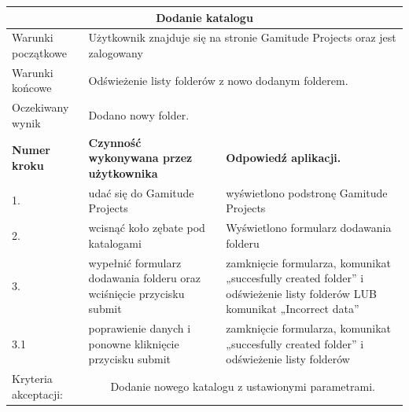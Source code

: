 \documentclass[a4paper,11pt]{report}
\begin{document}
\begin{table}[H]
	\centering
	\begin{tabular}{|p{2cm}|p{6cm}|p{6cm}|}
	\hline
	\multicolumn{3}{|c|}{\textbf{Dodanie katalogu}}\\
	\hline
	Warunki początkowe & \multicolumn{2}{|p{12cm}|}{Użytkownik znajduje się na stronie Gamitude Projects oraz jest zalogowany}\\
	\hline
	Warunki końcowe & \multicolumn{2}{|p{12cm}|}{Odświeżenie listy folderów z nowo dodanym folderem.}\\
	\hline
	Oczekiwany wynik & \multicolumn{2}{|p{12cm}|}{Dodano nowy folder.}\\
	\hline
	\textbf{Numer kroku} & \textbf{Czynność wykonywana przez użytkownika} & \textbf{Odpowiedź aplikacji.} \\
	\hline
	1. & udać się do Gamitude Projects & wyświetlono podstronę Gamitude Projects \\
	\hline
	2. & wcisnąć koło zębate pod katalogami & Wyświetlono formularz dodawania folderu \\
	\hline
	3. & wypełnić formularz dodawania folderu oraz wciśnięcie przycisku submit & zamknięcie formularza, komunikat „succesfully created folder” i odświeżenie listy folderów LUB komunikat „Incorrect data” \\
	\hline
	3.1 & poprawienie danych i ponowne kliknięcie przycisku submit & zamknięcie formularza, komunikat „succesfully created folder” i odświeżenie listy folderów \\
	\hline
	Kryteria akceptacji: & \multicolumn{2}{|c|}{Dodanie nowego katalogu z ustawionymi parametrami.} \\
	\hline
	\end{tabular}
\end{table}
\end{document}
